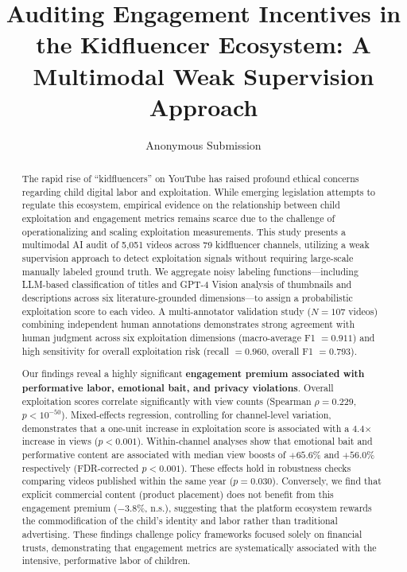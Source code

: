 \documentclass[letterpaper]{article} %
\title{Auditing Engagement Incentives in the Kidfluencer Ecosystem: A Multimodal Weak Supervision Approach}
\author{
    Anonymous Submission
}
\begin{document}
\maketitle

\begin{abstract}
The rapid rise of ``kidfluencers'' on YouTube has raised profound ethical concerns regarding child digital labor and exploitation. While emerging legislation attempts to regulate this ecosystem, empirical evidence on the relationship between child exploitation and engagement metrics remains scarce due to the challenge of operationalizing and scaling exploitation measurements. This study presents a multimodal AI audit of 5,051 videos across 79 kidfluencer channels, utilizing a weak supervision approach to detect exploitation signals without requiring large-scale manually labeled ground truth. We aggregate noisy labeling functions---including LLM-based classification of titles and GPT-4 Vision analysis of thumbnails and descriptions across six literature-grounded dimensions---to assign a probabilistic exploitation score to each video. A multi-annotator validation study ($N=107$ videos) combining independent human annotations demonstrates strong agreement with human judgment across six exploitation dimensions (macro-average F1 $= 0.911$) and high sensitivity for overall exploitation risk (recall $= 0.960$, overall F1 $= 0.793$).

Our findings reveal a highly significant \textbf{engagement premium associated with performative labor, emotional bait, and privacy violations}. Overall exploitation scores correlate significantly with view counts (Spearman $\rho = 0.229$, $p < 10^{-50}$). Mixed-effects regression, controlling for channel-level variation, demonstrates that a one-unit increase in exploitation score is associated with a 4.4$\times$ increase in views ($p < 0.001$). Within-channel analyses show that emotional bait and performative content are associated with median view boosts of $+65.6\%$ and $+56.0\%$ respectively (FDR-corrected $p<0.001$). These effects hold in robustness checks comparing videos published within the same year ($p=0.030$). Conversely, we find that explicit commercial content (product placement) does not benefit from this engagement premium ($-3.8\%$, n.s.), suggesting that the platform ecosystem rewards the commodification of the child's identity and labor rather than traditional advertising. These findings challenge policy frameworks focused solely on financial trusts, demonstrating that engagement metrics are systematically associated with the intensive, performative labor of children.
\end{abstract}
\end{document}
